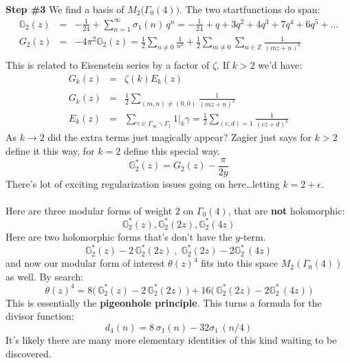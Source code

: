 \documentclass[12pt]{article}
\begin{document}
\noindent \textbf{Step \#3} We find a basis of $M_2 \big(\Gamma_0(4)\big)$.  The two startfunctions do span:
\begin{eqnarray*}
\mathbb{G}_2 (z) &=& - \frac{1}{24} + \sum_{n=1}^\infty \sigma_1(n) \, q^n  = - \frac{1}{24} + q + 3q^2 + 4q^3 + 7q^4 + 6q^5 + \dots \\
G_2(z) &=& - 4\pi^2 \mathbb{G}_2(z) = \frac{1}{2} \sum_{n \neq 0} \frac{1}{n^2}  + \frac{1}{2} \sum_{m \neq 0} \sum_{n \in \mathbb{Z}} \frac{1}{(mz+n)^2} \\
\end{eqnarray*}
This is related to Eisenstein series by a factor of $\zeta$.  If $k > 2$ we'd have:
\begin{eqnarray*} G_k(z) &=& \zeta(k) E_k(z) \\ \\
G_k(z) &=&  \frac{1}{2} \sum_{(m,n) \neq (0,0)} \frac{1}{(mz+n)^2}  \\
 E_k(z) &=& \sum_{\gamma \in \Gamma_\infty \backslash \Gamma_1 } 1\big|_k \gamma 
 = \frac{1}{2} \sum_{(c,d)=1} \frac{1}{(cz+d)^k}
\end{eqnarray*}
As $k \to 2$ did the extra terms just magically appear?  Zagier just says for $k > 2$ define it this way, for $k= 2$ define this special way.
$$ \mathbb{G}^*_2(z) = G_2(z) - \frac{\pi}{2y} $$
There's lot of exciting regularization issues going on here\dots letting $k = 2 + \epsilon$. \\ \\
Here are three modular forms of weight $2$ on $\Gamma_0(4)$, that are \textbf{not} holomorphic:
$$ \mathbb{G}^*_2(z), \mathbb{G}^*_2(2z) , \mathbb{G}^*_2(4z) $$
Here are two holomorphic forms that's don't have the $y$-term.
$$  \mathbb{G}^*_2(z) -  2\,\mathbb{G}^*_2(2z)  \; , \;  \mathbb{G}^*_2(2z) -  2\mathbb{G}^*_2\,(4z) $$
and now our modular form of interest $\theta(z)^4$ fits into this space $M_2(\Gamma_0(4))$ as well.  By search:
$$ \theta(z)^4 = 8 \big( \, \mathbb{G}^*_2(z) -  2\,\mathbb{G}^*_2(2z)  \, \big) + 16 \big( \,\mathbb{G}^*_2(2z) -  2\mathbb{G}^*_2\,(4z) \,\big)  $$
This is essentially the \textbf{pigeonhole principle}. This turns a formula for the divisor function:
$$ d_4(n) = 8 \,\sigma_1(n) - 32 \sigma_1\, (n/4) $$
It's likely there are many more elementary identities of this kind waiting to be discovered. 

\newpage
\end{document}

